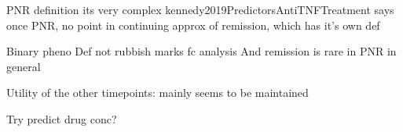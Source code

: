 \begin{outline}
PNR definition
    its very complex
    kennedy2019PredictorsAntiTNFTreatment says once PNR, no point in continuing
        approx of remission, which has it's own def

    Binary pheno Def not rubbish
        marks fc analysis
        And remission is rare in PNR in general

Utility of the other timepoints:
    mainly seems to be maintained

Try predict drug conc?


\end{outline}
